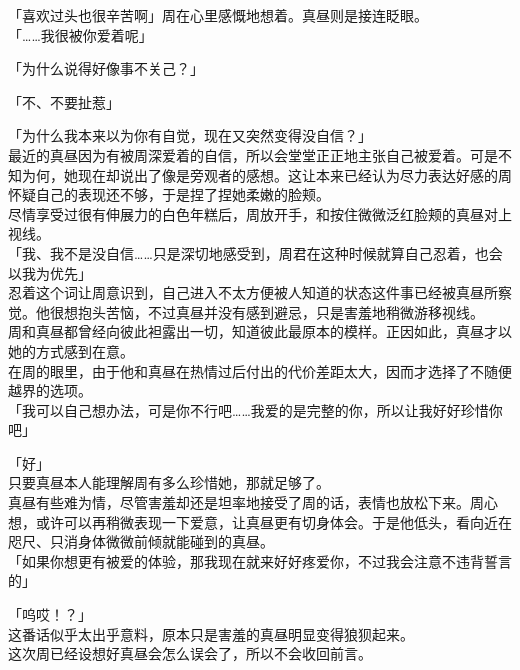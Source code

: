 「喜欢过头也很辛苦啊」周在心里感慨地想着。真昼则是接连眨眼。\\

「……我很被你爱着呢」

「为什么说得好像事不关己？」

「不、不要扯惹」

「为什么我本来以为你有自觉，现在又突然变得没自信？」\\

最近的真昼因为有被周深爱着的自信，所以会堂堂正正地主张自己被爱着。可是不知为何，她现在却说出了像是旁观者的感想。这让本来已经认为尽力表达好感的周怀疑自己的表现还不够，于是捏了捏她柔嫩的脸颊。\\

尽情享受过很有伸展力的白色年糕后，周放开手，和按住微微泛红脸颊的真昼对上视线。\\

「我、我不是没自信……只是深切地感受到，周君在这种时候就算自己忍着，也会以我为优先」\\

忍着这个词让周意识到，自己进入不太方便被人知道的状态这件事已经被真昼所察觉。他很想抱头苦恼，不过真昼并没有感到避忌，只是害羞地稍微游移视线。\\

周和真昼都曾经向彼此袒露出一切，知道彼此最原本的模样。正因如此，真昼才以她的方式感到在意。\\

在周的眼里，由于他和真昼在热情过后付出的代价差距太大，因而才选择了不随便越界的选项。\\

「我可以自己想办法，可是你不行吧……我爱的是完整的你，所以让我好好珍惜你吧」

「好」\\

只要真昼本人能理解周有多么珍惜她，那就足够了。\\

真昼有些难为情，尽管害羞却还是坦率地接受了周的话，表情也放松下来。周心想，或许可以再稍微表现一下爱意，让真昼更有切身体会。于是他低头，看向近在咫尺、只消身体微微前倾就能碰到的真昼。\\

「如果你想更有被爱的体验，那我现在就来好好疼爱你，不过我会注意不违背誓言的」

「呜哎！？」\\

这番话似乎太出乎意料，原本只是害羞的真昼明显变得狼狈起来。\\

这次周已经设想好真昼会怎么误会了，所以不会收回前言。

